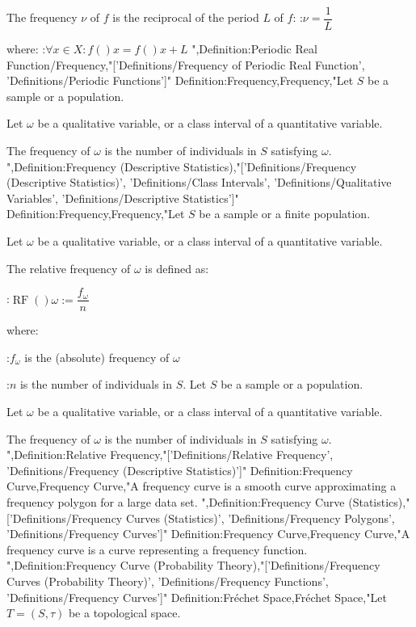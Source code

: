 The frequency $\nu$ of $f$ is the reciprocal of the period $L$ of $f$:
:$\nu = \dfrac 1 L$

where:
:$\forall x \in X: f \left(   \right)x = f \left(   \right){x + L}$
",Definition:Periodic Real Function/Frequency,"['Definitions/Frequency of Periodic Real Function', 'Definitions/Periodic Functions']"
Definition:Frequency,Frequency,"Let $S$ be a sample or a population.

Let $\omega$ be a qualitative variable, or a class interval of a quantitative variable.


The frequency of $\omega$ is the number of individuals in $S$ satisfying $\omega$.
",Definition:Frequency (Descriptive Statistics),"['Definitions/Frequency (Descriptive Statistics)', 'Definitions/Class Intervals', 'Definitions/Qualitative Variables', 'Definitions/Descriptive Statistics']"
Definition:Frequency,Frequency,"Let $S$ be a sample or a finite population.

Let $\omega$ be a qualitative variable, or a class interval of a quantitative variable.


The relative frequency of $\omega$ is defined as:

:$\operatorname {RF}  \left(   \right)\omega := \dfrac {f_\omega} n$

where:

:$f_\omega$ is the (absolute) frequency of $\omega$

:$n$ is the number of individuals in $S$.
Let $S$ be a sample or a population.

Let $\omega$ be a qualitative variable, or a class interval of a quantitative variable.


The frequency of $\omega$ is the number of individuals in $S$ satisfying $\omega$.
",Definition:Relative Frequency,"['Definitions/Relative Frequency', 'Definitions/Frequency (Descriptive Statistics)']"
Definition:Frequency Curve,Frequency Curve,"A frequency curve is a smooth curve approximating a frequency polygon for a large data set.
",Definition:Frequency Curve (Statistics),"['Definitions/Frequency Curves (Statistics)', 'Definitions/Frequency Polygons', 'Definitions/Frequency Curves']"
Definition:Frequency Curve,Frequency Curve,"A frequency curve is a curve representing a frequency function.
",Definition:Frequency Curve (Probability Theory),"['Definitions/Frequency Curves (Probability Theory)', 'Definitions/Frequency Functions', 'Definitions/Frequency Curves']"
Definition:Fréchet Space,Fréchet Space,"Let $T = \left( S, \tau \right)$ be a topological space.


